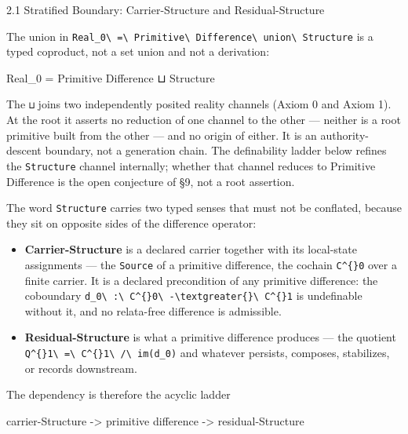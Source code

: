 \documentclass[
  10pt,
]{article}
\newenvironment{Shaded}{}{}
\newcommand{\NormalTok}[1]{#1}
\providecommand{\tightlist}{%
  \setlength{\itemsep}{0pt}\setlength{\parskip}{0pt}}
\providecommand{\tightlist}{%
  \setlength{\itemsep}{0pt}\setlength{\parskip}{0pt}}
\DeclareRobustCommand{\texttt}[1]{{\paperSymbolFont\nolinkurl{#1}}}
\begin{document}
2.1 Stratified Boundary: Carrier-Structure and Residual-Structure

The union in \texttt{Real\_0\ =\ Primitive\ Difference\ union\ Structure} is a typed coproduct, not a set union and not a derivation:

\begin{Shaded}
\begin{Highlighting}[]
\NormalTok{Real\_0 = Primitive Difference  ⊔  Structure}
\end{Highlighting}
\end{Shaded}

The \texttt{⊔} joins two independently posited reality channels (Axiom 0 and Axiom 1). At the root it asserts no reduction of one channel to the other --- neither is a root primitive built from the other --- and no origin of either. It is an authority-descent boundary, not a generation chain. The definability ladder below refines the \texttt{Structure} channel internally; whether that channel reduces to Primitive Difference is the open conjecture of §9, not a root assertion.

The word \texttt{Structure} carries two typed senses that must not be conflated, because they sit on opposite sides of the difference operator:

\begin{itemize}
\tightlist
\item
  \textbf{Carrier-Structure} is a declared carrier together with its local-state assignments --- the \texttt{Source} of a primitive difference, the cochain \texttt{C\^{}0} over a finite carrier. It is a declared precondition of any primitive difference: the coboundary \texttt{d\_0\ :\ C\^{}0\ -\textgreater{}\ C\^{}1} is undefinable without it, and no relata-free difference is admissible.
\item
  \textbf{Residual-Structure} is what a primitive difference produces --- the quotient \texttt{Q\^{}1\ =\ C\^{}1\ /\ im(d\_0)} and whatever persists, composes, stabilizes, or records downstream.
\end{itemize}

The dependency is therefore the acyclic ladder

\begin{Shaded}
\begin{Highlighting}[]
\NormalTok{carrier{-}Structure  {-}\textgreater{}  primitive difference  {-}\textgreater{}  residual{-}Structure}
\end{Highlighting}
\end{Shaded}
\end{document}
